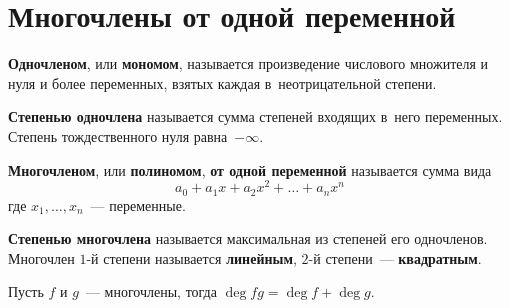 \section{Многочлены от одной переменной}
 \textbf{Одночленом}, или \textbf{мономом}, называется произведение числового множителя и нуля и более переменных, взятых каждая в~неотрицательной степени.

\textbf{Степенью одночлена} называется сумма степеней входящих в~него переменных.
Степень тождественного нуля равна~$-\infty$.

 \textbf{Многочленом}, или \textbf{полиномом}, \textbf{от одной переменной} называется сумма вида
\begin{equation*}
a_0 + a_1 x + a_2 x^2 + \ldots + a_n x^n
\end{equation*}
где $x_1, \ldots, x_n$~--- переменные.

\textbf{Степенью многочлена} называется максимальная из степеней его одночленов.
Многочлен $1$\nobreakdash-й степени называется \textbf{линейным}, $2$\nobreakdash-й степени~--- \textbf{квадратным}.

\begin{lemma}
Пусть $f$ и $g$~--- многочлены, тогда $\deg fg = \deg f + \deg g$.
\end{lemma}